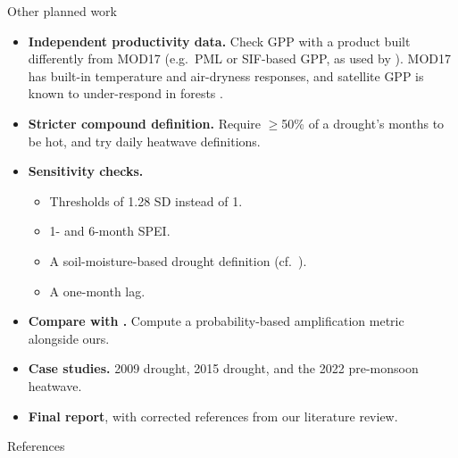 \documentclass[11pt,aspectratio=169]{beamer}
\begin{document}
\begin{frame}{Other planned work}
  \footnotesize
  \begin{itemize}
    \item \textbf{Independent productivity data.} Check GPP with a product
      built differently from MOD17 (e.g.\ PML or SIF-based GPP, as used by
      \citealp{sen2026}). MOD17 has built-in temperature and air-dryness
      responses, and satellite GPP is known to under-respond in forests
      \citep{flach2021}.
    \item \textbf{Stricter compound definition.} Require $\ge$50\% of a
      drought's months to be hot, and try daily heatwave definitions.
    \item \textbf{Sensitivity checks.}
      \begin{itemize}
        \item Thresholds of 1.28 SD instead of 1.
        \item 1- and 6-month SPEI.
        \item A soil-moisture-based drought definition (cf.\ \citealp{liang2026}).
        \item A one-month lag.
      \end{itemize}
    \item \textbf{Compare with \citet{meena2026}.} Compute a
      probability-based amplification metric alongside ours.
    \item \textbf{Case studies.} 2009 drought, 2015 drought, and the 2022
      pre-monsoon heatwave.
    \item \textbf{Final report}, with corrected references from our
      literature review.
  \end{itemize}
\end{frame}

\begin{frame}[allowframebreaks]{References}
  \footnotesize
  
\end{frame}
\end{document}
